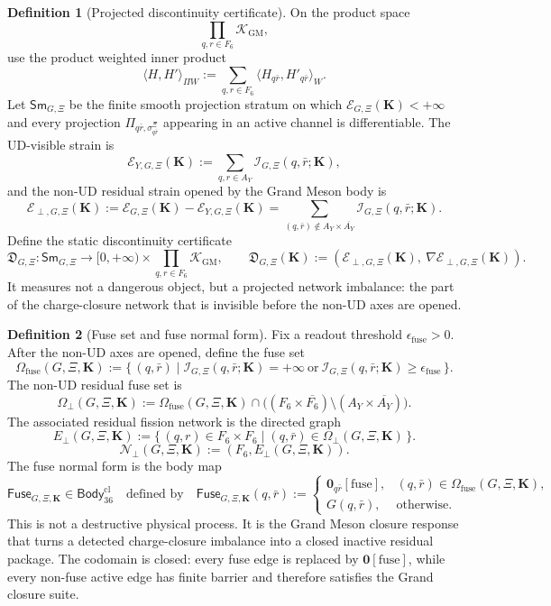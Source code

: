 \documentclass[11pt]{article}
\theoremstyle{definition}
\newtheorem{definition}{Definition}
\theoremstyle{plain}
\begin{document}
\begin{definition}[Projected discontinuity certificate]
On the product space
\[
  \prod_{q,r\in F_6}\mathcal K_{\mathrm{GM}},
\]
use the product weighted inner product
\[
  \langle H,H'\rangle_{\Pi W}
  :=
  \sum_{q,r\in F_6}
  \langle H_{q\bar r},H'_{q\bar r}\rangle_W .
\]
Let \(\mathsf{Sm}_{G,\Xi}\) be the finite smooth projection
stratum on which
\(\mathcal E_{G,\Xi}(\mathbf K)<+\infty\) and every projection
\(\Pi_{q\bar r,\sigma^\Xi_{q\bar r}}\) appearing in an active channel is
differentiable.
The UD-visible strain is
\[
  \mathcal E_{Y,G,\Xi}(\mathbf K)
  :=
  \sum_{q,r\in A_Y}\mathcal I_{G,\Xi}(q,\bar r;\mathbf K),
\]
and the non-UD residual strain opened by the Grand Meson body is
\[
  \mathcal E_{\perp,G,\Xi}(\mathbf K)
  :=
  \mathcal E_{G,\Xi}(\mathbf K)-\mathcal E_{Y,G,\Xi}(\mathbf K)
  =
  \sum_{(q,\bar r)\notin A_Y\times\overline{A_Y}}
  \mathcal I_{G,\Xi}(q,\bar r;\mathbf K).
\]
Define the static discontinuity certificate
\[
  \mathfrak D_{G,\Xi}:\mathsf{Sm}_{G,\Xi}\to
  [0,+\infty)\times
  \prod_{q,r\in F_6}\mathcal K_{\mathrm{GM}},
  \qquad
  \mathfrak D_{G,\Xi}(\mathbf K)
  :=
  \left(
    \mathcal E_{\perp,G,\Xi}(\mathbf K),\
    \nabla\mathcal E_{\perp,G,\Xi}(\mathbf K)
  \right).
\]
It measures not a dangerous object, but a projected network imbalance: the
part of the charge-closure network that is invisible before the non-UD axes
are opened.
\end{definition}

\begin{definition}[Fuse set and fuse normal form]
Fix a readout threshold \(\epsilon_{\mathrm{fuse}}>0\).  After the non-UD
axes are opened, define the fuse set
\[
  \Omega_{\mathrm{fuse}}(G,\Xi,\mathbf K)
  :=
  \{\,(q,\bar r)\mid
  \mathcal I_{G,\Xi}(q,\bar r;\mathbf K)=+\infty
  \ \text{or}\
  \mathcal I_{G,\Xi}(q,\bar r;\mathbf K)\ge\epsilon_{\mathrm{fuse}}\,\}.
\]
The non-UD residual fuse set is
\[
  \Omega_{\perp}(G,\Xi,\mathbf K)
  :=
  \Omega_{\mathrm{fuse}}(G,\Xi,\mathbf K)
  \cap
  \bigl((F_6\times\overline{F_6})
  \setminus(A_Y\times\overline{A_Y})\bigr).
\]
The associated residual fission network is the directed graph
\[
  E_{\perp}(G,\Xi,\mathbf K)
  :=
  \{\,(q,r)\in F_6\times F_6\mid
  (q,\bar r)\in\Omega_{\perp}(G,\Xi,\mathbf K)\,\}.
\]
\[
  \mathcal N_{\perp}(G,\Xi,\mathbf K)
  :=
  (F_6,E_{\perp}(G,\Xi,\mathbf K)).
\]
The fuse normal form is the body map
\[
  \mathsf{Fuse}_{G,\Xi,\mathbf K}\in\mathsf{Body}_{36}^{\mathrm{cl}}
  \quad\text{defined by}\quad
  \mathsf{Fuse}_{G,\Xi,\mathbf K}(q,\bar r)
  :=
  \begin{cases}
    \mathbf 0_{q\bar r}[\mathrm{fuse}],
      & (q,\bar r)\in\Omega_{\mathrm{fuse}}(G,\Xi,\mathbf K),\\
    G(q,\bar r), & \text{otherwise}.
  \end{cases}
\]
This is not a destructive physical process.  It is the Grand Meson closure
response that turns a detected charge-closure imbalance into a closed
inactive residual package.
The codomain is closed: every fuse edge is replaced by
\(\mathbf 0[\mathrm{fuse}]\), while every non-fuse active edge has finite
barrier and therefore satisfies the Grand closure suite.
\end{definition}
\end{document}
